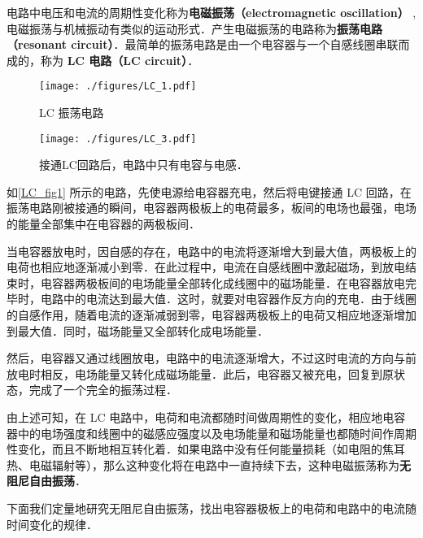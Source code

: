 

电路中电压和电流的周期性变化称为\textbf{电磁振荡（electromagnetic oscillation）} , 电磁振荡与机械振动有类似的运动形式．产生电磁振荡的电路称为\textbf{振荡电路（resonant circuit）}．最简单的振荡电路是由一个电容器与一个自感线圈串联而成的，称为\textbf{ LC 电路（LC circuit）}．
\begin{figure}[ht]
\centering
\texttt{[image: ./figures/LC\_1.pdf]}
\caption{LC 振荡电路} \label{LC_fig1}
\end{figure}
\begin{figure}[ht]
\centering
\texttt{[image: ./figures/LC\_3.pdf]}
\caption{接通LC回路后，电路中只有电容与电感．} \label{LC_fig3}
\end{figure}
如\autoref{LC_fig1} 所示的电路，先使电源给电容器充电，然后将电键接通 LC 回路，在振荡电路刚被接通的瞬间，电容器两极板上的电荷最多，板间的电场也最强，电场的能量全部集中在电容器的两极板间．

当电容器放电时，因自感的存在，电路中的电流将逐渐增大到最大值，两极板上的电荷也相应地逐渐减小到零．在此过程中，电流在自感线圈中激起磁场，到放电结束时，电容器两极板间的电场能量全部转化成线圈中的磁场能量．在电容器放电完毕时，电路中的电流达到最大值．这时，就要对电容器作反方向的充电．由于线圈的自感作用，随着电流的逐渐减弱到零，电容器两极板上的电荷又相应地逐渐增加到最大值．同时，磁场能量又全部转化成电场能量．

然后，电容器又通过线圈放电，电路中的电流逐渐增大，不过这时电流的方向与前放电时相反，电场能量又转化成磁场能量．此后，电容器又被充电，回复到原状态，完成了一个完全的振荡过程．

由上述可知，在 LC 电路中，电荷和电流都随时间做周期性的变化，相应地电容器中的电场强度和线圈中的磁感应强度以及电场能量和磁场能量也都随时间作周期性变化，而且不断地相互转化着．如果电路中没有任何能量损耗（如电阻的焦耳热、电磁辐射等），那么这种变化将在电路中一直持续下去，这种电磁振荡称为\textbf{无阻尼自由振荡}．

下面我们定量地研究无阻尼自由振荡，找出电容器极板上的电荷和电路中的电流随时间变化的规律．

